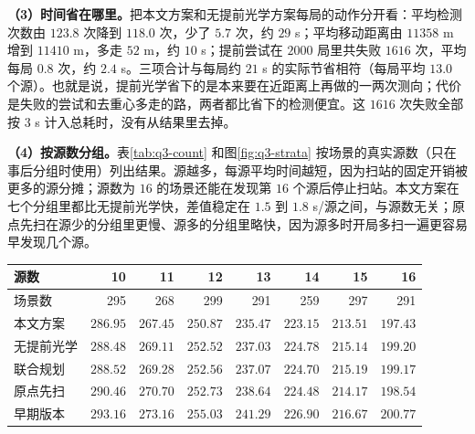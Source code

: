\textbf{（3）时间省在哪里。}把本文方案和无提前光学方案每局的动作分开看：平均检测次数由 $123.8$ 次降到 $118.0$ 次，少了 $5.7$ 次，约 $29$ s；平均移动距离由 $11358$ m 增到 $11410$ m，多走 $52$ m，约 $10$ s；提前尝试在 $2000$ 局里共失败 $1616$ 次，平均每局 $0.8$ 次，约 $2.4$ s。三项合计与每局约 $21$ s 的实际节省相符（每局平均 $13.0$ 个源）。也就是说，提前光学省下的是本来要在近距离上再做的一两次测向；代价是失败的尝试和去重心多走的路，两者都比省下的检测便宜。这 $1616$ 次失败全部按 $3$ s 计入总耗时，没有从结果里去掉。

\textbf{（4）按源数分组。}表\ref{tab:q3-count} 和图\ref{fig:q3-strata} 按场景的真实源数（只在事后分组时使用）列出结果。源越多，每源平均时间越短，因为扫站的固定开销被更多的源分摊；源数为 $16$ 的场景还能在发现第 $16$ 个源后停止扫站。本文方案在七个分组里都比无提前光学快，差值稳定在 $1.5$ 到 $1.8$ s/源之间，与源数无关；原点先扫在源少的分组里更慢、源多的分组里略快，因为源多时开局多扫一遍更容易早发现几个源。

\Needspace{44mm}
\begin{center}
\begin{minipage}{\linewidth}
\centering\small
{}
\label{tab:q3-count}
\vspace{4pt}
\begin{tabular}{@{}lrrrrrrr@{}}
\toprule
源数 & 10 & 11 & 12 & 13 & 14 & 15 & 16 \\
\midrule
场景数 & 295 & 268 & 299 & 291 & 259 & 297 & 291 \\
本文方案 & $286.95$ & $267.45$ & $250.87$ & $235.47$ & $223.15$ & $213.51$ & $197.43$ \\
无提前光学 & $288.48$ & $269.11$ & $252.52$ & $237.03$ & $224.78$ & $215.14$ & $199.20$ \\
联合规划 & $288.52$ & $269.28$ & $252.56$ & $237.07$ & $224.70$ & $215.19$ & $199.17$ \\
原点先扫 & $290.46$ & $270.70$ & $252.73$ & $238.64$ & $224.48$ & $214.17$ & $198.54$ \\
早期版本 & $293.16$ & $273.16$ & $255.03$ & $241.29$ & $226.90$ & $216.67$ & $200.77$ \\
\bottomrule
\end{tabular}
\end{minipage}
\end{center}

\begin{center}
\begin{minipage}{\linewidth}
\centering
\QThreeStrataFigure
{}
\label{fig:q3-strata}
\end{minipage}
\end{center}

